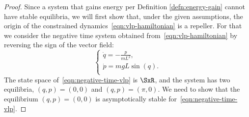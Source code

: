 \begin{proof}
Since a system that gains energy per Definition \ref{defn:energy-gain}
cannot have stable equilibria,
we will first show that, under the given assumptions, the origin of the
constrained dynamics~\eqref{eqn:vlp-hamiltonian} is a repeller. 
For that we consider the negative time system obtained
from~\eqref{eqn:vlp-hamiltonian} by reversing the sign of the vector field:
\begin{equation}\label{eqn:negative-time-vlp}
   \begin{cases}
      \dot{q} = -\frac{p}{m L^2} 
      ,\\
      \dot{p} = mgL\sin(q)
      . \\ 
   \end{cases}
\end{equation}
The state space of~\eqref{eqn:negative-time-vlp} is 
\(\SxR\), and the system has two equilibria,
\((q,p) = (0,0)\) and \((q,p) = (\pi,0)\). 
We need to show that the equilibrium \((q,p) = (0,0)\) is
asymptotically stable for~\eqref{eqn:negative-time-vlp}. 


\end{proof}
